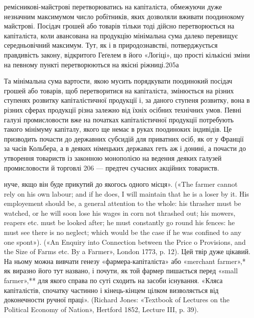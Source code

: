 ремісникові-майстрові перетворюватись на капіталіста, обмежуючи
дуже незначним максимумом число робітників, яких дозволяли
вживати поодинокому майстрові. Посідач грошей або товарів
тільки тоді дійсно перетворюється на капіталіста, коли авансована
на продукцію мінімальна сума далеко перевищує середньовічний
максимум. Тут, як і в природознавстві, потверджується
правдивість закону, відкритого Геґелем в його «Логіці»,
що прості кількісні зміни на певному пункті перетворюються
на якісні ріжниці.205а

Та мінімальна сума вартости, якою мусить порядкувати поодинокий
посідач грошей або товарів, щоб перетворитися на капіталіста,
змінюється на різних ступенях розвитку капіталістичної
продукції і, за даного ступеня розвитку, вона в різних сферах
продукції різна залежно від їхніх осібних технічних умов. Певні
галузі промисловости вже на початках капіталістичної продукції
потребують такого мінімуму капіталу, якого ще немає в руках
поодиноких індивідів. Це призводить почасти до державних субсидій
для приватних осіб, як от у Франції за часів Кольбера, а в
деяких німецьких державах геть аж і донині, а почасти до утворення
товариств із законною монополією на ведення деяких
галузей промисловости й торговлі 206 — предтеч сучасних акційних
товариств.

нуче, якщо він буде прикутий до якогось одного місця». («The farmer
cannot rely on his own labour; and if he does, I will maintain that he is
a loser by it. His employement should be, a general attention to the whole:
his thrasher must be watched, or he will soon lose his wages in corn not
thrashed out; his mowers, reapers etc. must be looked after; he must constantly
go round his fences: he must see there is no neglect; which would
be the case if he was confined to any one spont»). («An Enquiry into Connection
between the Price o Provisions, and the Size of Farms etc. By a
Farmer», London 1773, p. 12). Цей твір дуже цікавий. На ньому можна
вивчати генезу «фармера-капіталіста» або «merchant farmer»,* як виразно
його тут названо, і почути, як той фармер пишається перед «small
farmer»,** для якого справа по суті сходить на засоби існування. «Кляса
капіталістів, спочатку частинно і кінець-кінцем цілком визволяється
від доконечности ручної праці». (Richard Jones: «Textbook of Lectures on
the Political Economy of Nation», Hertford 1852, Lecture III, p. 39).

